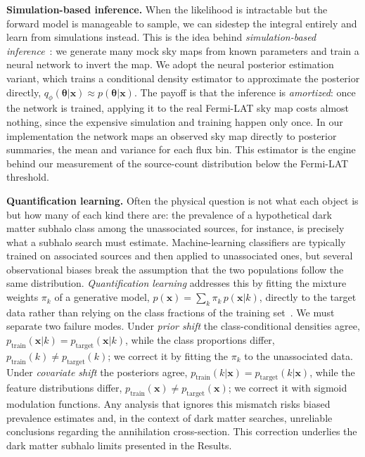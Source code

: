 \textbf{Simulation-based inference.} When the likelihood is intractable but the forward model is manageable to sample, we can sidestep the integral entirely and learn from simulations instead. This is the idea behind \emph{simulation-based inference}~\cite{Cranmer:2020}: we generate many mock sky maps from known parameters and train a neural network to invert the map. We adopt the neural posterior estimation variant, which trains a conditional density estimator to approximate the posterior directly, $q_\phi(\boldsymbol{\theta}|\mathbf{x}) \approx p(\boldsymbol{\theta}|\mathbf{x})$. The payoff is that the inference is \emph{amortized}: once the network is trained, applying it to the real Fermi-LAT sky map costs almost nothing, since the expensive simulation and training happen only once. In our implementation the network maps an observed sky map directly to posterior summaries, the mean and variance for each flux bin. This estimator is the engine behind our measurement of the source-count distribution below the Fermi-LAT threshold.

\textbf{Quantification learning.} Often the physical question is not what each object is but how many of each kind there are: the prevalence of a hypothetical dark matter subhalo class among the unassociated sources, for instance, is precisely what a subhalo search must estimate. Machine-learning classifiers are typically trained on associated sources and then applied to unassociated ones, but several observational biases break the assumption that the two populations follow the same distribution. \emph{Quantification learning} addresses this by fitting the mixture weights $\pi_k$ of a generative model, $p(\mathbf{x}) = \sum_k \pi_k\, p(\mathbf{x}|k)$, directly to the target data rather than relying on the class fractions of the training set~\cite{10.1145/3117807_Gonzalez_quantification}. We must separate two failure modes. Under \emph{prior shift} the class-conditional densities agree, $p_{\mathrm{train}}(\mathbf{x}|k) = p_{\mathrm{target}}(\mathbf{x}|k)$, while the class proportions differ, $p_{\mathrm{train}}(k) \neq p_{\mathrm{target}}(k)$; we correct it by fitting the $\pi_k$ to the unassociated data. Under \emph{covariate shift} the posteriors agree, $p_{\mathrm{train}}(k|\mathbf{x}) = p_{\mathrm{target}}(k|\mathbf{x})$, while the feature distributions differ, $p_{\mathrm{train}}(\mathbf{x}) \neq p_{\mathrm{target}}(\mathbf{x})$; we correct it with sigmoid modulation functions. Any analysis that ignores this mismatch risks biased prevalence estimates and, in the context of dark matter searches, unreliable conclusions regarding the annihilation cross-section. This correction underlies the dark matter subhalo limits presented in the Results.

